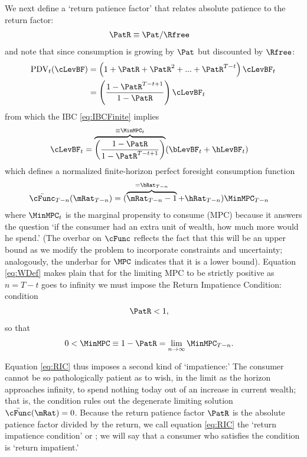 \documentclass[BufferStockTheory]{subfiles}
\begin{document}
We next define a `return patience factor' that relates absolute patience to the return factor:
\begin{align}
  \PatR  & \equiv  {\Pat}/\Rfree \label{eq:PatR}
\end{align}
and note that since consumption is growing by $\Pat$ but discounted by $\Rfree$:
\begin{align}
  \text{PDV}_{t}(\cLevBF)  & = \left(1+\PatR+\PatR^{2}+...+ \PatR^{T-t}\right)\cLevBF_{t} \notag
  \\  & = \left(\frac{1-\PatR^{T-t+1}}{1-\PatR}\right)\cLevBF_{t}
\end{align}
from which the IBC \eqref{eq:IBCFinite} implies
\begin{align}
  \cLevBF_{t}  & = \overbrace{\left(\frac{1-\PatR}{1-\PatR^{T-t+1}}\right)}^{\equiv \MinMPC_{t}}
                 (\bLevBF_{t}+\hLevBF_{t})   \label{eq:WDef}
\end{align}
which defines a normalized finite-horizon perfect foresight consumption function
\begin{align}
  \bar{\cFunc}_{T-n}(\mRat_{T-n})  & = (\overbrace{\mRat_{T-n}-1}^{=\bRat_{T-n}}+\hRat_{T-n})\MinMPC_{T-n}
\end{align}
where $\MinMPC_{t}$ is the marginal propensity to consume (MPC) because it answers the
question `if the consumer had an extra unit of wealth, how much more would he spend.' \hypertarget{RIC}{}
(The overbar on $\cFunc$ reflects the fact that this will be an upper bound as we modify the problem to incorporate constraints and uncertainty; analogously, the underbar for $\MPC$ indicates that it is a lower bound).
Equation \eqref{eq:WDef} makes plain that for the limiting
MPC to be strictly positive as $n=T-t$ goes to infinity we must impose the Return Impatience Condition:
condition 
\begin{align}
  \PatR  & < 1   \label{eq:RIC},
\end{align}
so that
\begin{align}
  0 <  \MinMPC  & \equiv   1-\PatR = \lim_{n \rightarrow \infty} \MinMPC_{T-n} \label{eq:MinMPCDef}
                  .
\end{align}

Equation \eqref{eq:RIC} thus imposes a second kind of `impatience:' The consumer cannot be so pathologically patient as to wish, in the limit as the horizon approaches infinity, to spend nothing today out of an increase in current wealth; that is, the condition rules out the degenerate limiting solution $\bar{\cFunc}(\mRat)=0$.  Because the return patience factor $\PatR$ is the absolute patience factor divided by the return, we call equation \eqref{eq:RIC} the `return impatience condition' or \RIC; we will say that a consumer who satisfies the condition is `return impatient.'
\end{document}
